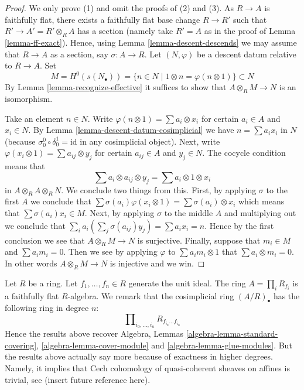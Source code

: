 \begin{proof}
We only prove (1) and omit the proofs of (2) and (3).
As $R \to A$ is faithfully flat, there exists a faithfully flat
base change $R \to R'$ such that $R' \to A' = R' \otimes_R A$ has
a section (namely take $R' = A$ as in the proof of
Lemma \ref{lemma-ff-exact}). Hence, using
Lemma \ref{lemma-descent-descends}
we may assume that $R \to A$ as a section, say $\sigma : A \to R$.
Let $(N, \varphi)$ be a descent datum relative to $R \to A$.
Set
$$
M = H^0(s(N_\bullet)) = \{n \in N \mid 1 \otimes n = \varphi(n \otimes 1)\}
\subset
N
$$
By Lemma \ref{lemma-recognize-effective} it suffices to show that
$A \otimes_R M \to N$ is an isomorphism.

\medskip\noindent
Take an element $n \in N$. Write
$\varphi(n \otimes 1) = \sum a_i \otimes x_i$ for certain
$a_i \in A$ and $x_i \in N$. By Lemma \ref{lemma-descent-datum-cosimplicial}
we have $n = \sum a_i x_i$ in $N$ (because
$\sigma^0_0 \circ \delta^1_0 = \text{id}$ in any cosimplicial object).
Next, write $\varphi(x_i \otimes 1) = \sum a_{ij} \otimes y_j$ for
certain $a_{ij} \in A$ and $y_j \in N$.
The cocycle condition means that
$$
\sum a_i \otimes a_{ij} \otimes y_j = \sum a_i \otimes 1 \otimes x_i
$$
in $A \otimes_R A \otimes_R N$. We conclude two things from this.
First, by applying $\sigma$ to the first $A$ we conclude that
$\sum \sigma(a_i) \varphi(x_i \otimes 1) = \sum \sigma(a_i) \otimes x_i$
which means that $\sum \sigma(a_i) x_i \in M$. Next, by applying
$\sigma$ to the middle $A$ and multiplying out we conclude that
$\sum_i a_i (\sum_j \sigma(a_{ij}) y_j) = \sum a_i x_i = n$. Hence
by the first conclusion we see that $A \otimes_R M \to N$ is
surjective. Finally, suppose that $m_i \in M$ and
$\sum a_i m_i = 0$. Then we see by applying $\varphi$ to
$\sum a_im_i \otimes 1$ that $\sum a_i \otimes m_i = 0$.
In other words $A \otimes_R M \to N$ is injective and we win.
\end{proof}

\begin{remark}
\label{remark-standard-covering}
Let $R$ be a ring. Let $f_1, \ldots, f_n\in R$ generate the
unit ideal. The ring $A = \prod_i R_{f_i}$ is a faithfully flat
$R$-algebra. We remark that the cosimplicial ring $(A/R)_\bullet$
has the following ring in degree $n$:
$$
\prod\nolimits_{i_0, \ldots, i_n} R_{f_{i_0}\ldots f_{i_n}}
$$
Hence the results above recover
Algebra, Lemmas \ref{algebra-lemma-standard-covering},
\ref{algebra-lemma-cover-module} and \ref{algebra-lemma-glue-modules}.
But the results above actually say more because of exactness
in higher degrees. Namely, it implies that Cech cohomology of quasi-coherent
sheaves on affines is trivial, see (insert future reference here).
\end{remark}

